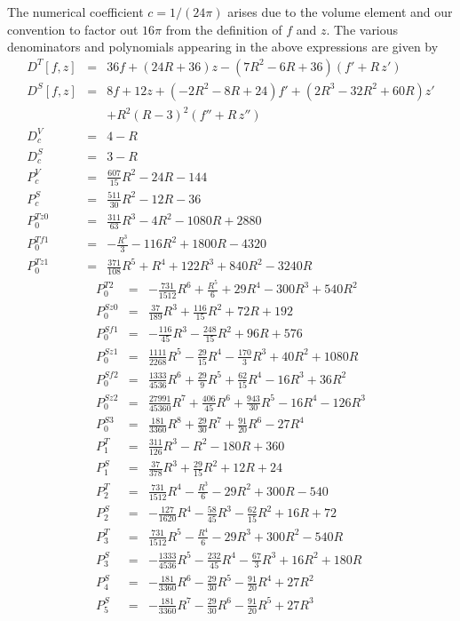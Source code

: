 \documentclass[notitlepage,eqsecnum,bm,amsmath,preprintnumbers,superscriptaddress,nofootinbib,aps,11pt]{revtex4-1}
\def\R{\rho}
\def\R{R}
\begin{document}
The numerical coefficient $c = 1/(24 \pi)$ arises due to the volume element and our convention to factor out $16 \pi$ from the definition of $f$ and $z$. The various denominators and polynomials appearing in the above expressions are given by
\begin{eqnarray}
D^T [f,z]&=& 36 f + (24\R+36) z - (7\R^2-6\R+36)(f'+\R\,z')\\
D^S [f,z]&=& 8 f +12 z +(-2\R^2-8\R+24) f' +(2\R^3-32\R^2+60\R) z' \\ \nonumber
&&+\R^2 (\R-3)^2 (f''+\R\, z'')\\
D_c^V &=& 4-\R\\
D_c^S &=& 3-\R
\\
P_c^V&=&\frac{607}{15}\R^2-24\R-144\\
P_c^S&=&\frac{511}{30}\R^2 -12\R-36\\ 
P_0^{Tz0}&=&\frac{311}{63}\R^3-4\R^2-1080\R +2880
 \\
P_0^{Tf1}&=& -\frac{\R^3}{3} -116\R^2+1800\R-4320
\\
P_0^{Tz1}&=& \frac{371}{108}\R^5+\R^4+122\R^3+840\R^2-3240\R
\end{eqnarray}
\begin{eqnarray} %
P_0^{T2}&=&-\frac{731}{1512}\R^6+\frac{\R^5}{6}+29\R^4-300\R^3+540\R^2\\
P_0^{Sz0}&=&\frac{37}{189}\R^3+\frac{116}{15}\R^2+72\R+192
\\
P_0^{Sf1}&=&-\frac{116}{45}\R^3-\frac{248}{15}\R^2+96\R+576 
\\
P_0^{Sz1}&=&\frac{1111}{2268}\R^5-\frac{29}{15}\R^4-\frac{170}{3}\R^3+40\R^2+1080\R\\
P_0^{Sf2}&=&\frac{1333}{4536}\R^6+\frac{29}{9}\R^5+\frac{62}{15}\R^4-16\R^3+36\R^2
\\
P_0^{Sz2}&=& \frac{27991}{45360}\R^7+\frac{406}{45}\R^6+\frac{943}{30}\R^5-16\R^4-126\R^3\\
\label{P0S3}
P_0^{S3}&=&\frac{181}{3360}\R^8+\frac{29}{30}\R^7+\frac{91}{20}\R^6-27\R^4\\ 
P_1^T&=&\frac{311}{126}\R^3-\R^2-180\R+360\\
P_1^S&=&\frac{37}{378}\R^3+\frac{29}{15}\R^2+12\R+24\\
P_2^T&=&
\frac{731}{1512}\R^4-\frac{\R^3}{6}-29\R^2+300\R-540\\
P_2^S&=&-\frac{127}{1620}\R^4-\frac{58}{45}\R^3-\frac{62}{15}\R^2+16\R+72\\ 
P_3^T&=&
\frac{731}{1512}\R^5-\frac{\R^4}{6}-29\R^3+300\R^2-540\R\\
P_3^S&=&-\frac{1333}{4536}\R^5-\frac{232}{45}\R^4-\frac{67}{3}\R^3+16\R^2+180\R\\
P_4^S&=&-\frac{181}{3360}\R^6-\frac{29}{30}\R^5-\frac{91}{20}\R^4+27\R^2\\ P_5^S&=&-\frac{181}{3360}\R^7-\frac{29}{30}\R^6-\frac{91}{20}\R^5+27\R^3
\end{eqnarray}





  
  
\end{document}

